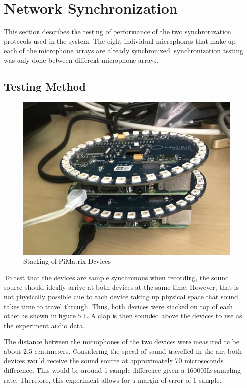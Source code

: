 \documentclass[hidelinks,12pt]{report} %
\begin{document}
\section{Network Synchronization}

This section describes the testing of performance of the two synchronization protocols used in the system. The eight individual microphones that make up each of the microphone arrays are already synchronized, synchronization testing was only done between different microphone arrays. 

\subsection{Testing Method}
\begin{figure}[h]
\centering
\includegraphics[scale = 1.0]{fig5.1} 
\caption{Stacking of PiMatrix Devices}
\label{fig}
\end{figure}

To test that the devices are sample synchronous when recording, the sound source should ideally arrive at both devices at the same time. However, that is not physically possible due to each device taking up physical space that sound takes time to travel through. Thus, both devices were stacked on top of each other as shown in figure 5.1. A clap is then sounded above the devices to use as the experiment audio data. 

The distance between the microphones of the two devices were measured to be about 2.5 centimeters. Considering the speed of sound travelled in the air, both devices would receive the sound source at approximately 70 microseconds difference. This would be around 1 sample difference given a 16000Hz sampling rate. Therefore, this experiment allows for a margin of error of 1 sample. 
\end{document}
